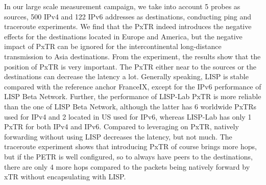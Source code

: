 In our large scale measurement campaign, we take into account 5 probes as sources, 500 IPv4 and 122 IPv6 addresses as destinations, conducting ping and traceroute experiments. We find that the PxTR indeed introduces the negative effects for the destinations located in Europe and America, but the negative impact of PxTR can be ignored for the intercontinental long-distance transmission to Asia destinations. From the experiment, the results show that the position of PxTR is very important. The PxTR either near to the sources or the destinations can decrease the latency a lot. Generally speaking, LISP is stable compared with the reference anchor FranceIX, except for the IPv6 performance of LISP Beta Network. Further, the performance of LISP-Lab PxTR is more reliable than the one of LISP Beta Network, although the latter has 6 worldwide PxTRs used for IPv4 and 2 located in US used for IPv6, whereas LISP-Lab has only 1 PxTR for both IPv4 and IPv6. Compared to leveraging on PxTR, natively forwarding without using LISP decreases the latency, but not much. The traceroute experiment shows that introducing PxTR of course brings more hops, but if the PETR is well configured, so to always have peers to the destinations, there are only 4 more hops compared to the packets being natively forward by xTR without encapsulating with LISP.
